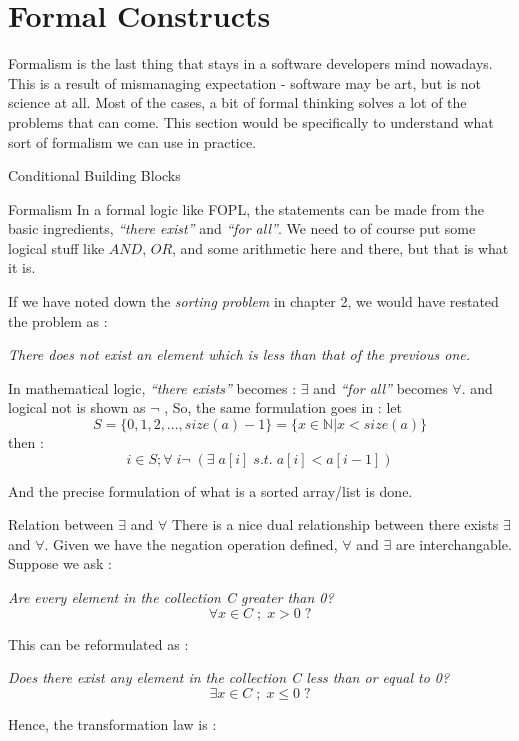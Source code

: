 \chapter{Formal Constructs}\label{using-predicates}

{\LARGE F}ormalism is the last thing that stays in a software developers mind nowadays. This is a result of mismanaging expectation - software may be art, but is not science at all. Most of the cases, a bit of formal thinking solves a lot of the problems that can come.
This section would be specifically to understand what sort of formalism we can use in practice.

\begin{section}{Conditional Building Blocks}

\begin{subsection}{Formalism}
In a formal logic like FOPL, the statements can be made from the basic ingredients, 
\emph{``there exist''} and \emph{``for all''}. We need to of course put some logical stuff like $AND$, $OR$,
and some arithmetic here and there, but that is what it is.

If we have noted down the \emph{sorting problem} in chapter 2, we would have restated the problem as :

\begin{center}
\emph{ There does not exist an element which is less than that of the previous one. }
\end{center} 

In mathematical logic, \emph{``there exists''} becomes : $\exists$ and \emph{``for all''} becomes $\forall$.
and logical not is shown as $\neg$ ,  So, the same formulation goes in : let 
$$
S = \{ 0, 1, 2, ... , size(a)-1  \} =  \{  x \in \mathbb{N} | x < size(a) \} 
$$
then :
$$
  i \in S ; \forall \; i  \neg \; ( \exists \; a[i] \; s.t. \; a[i] < a[i-1]    ) 
$$ 

And the precise formulation of what is a sorted array/list is done.
\end{subsection}
\begin{subsection}{Relation between $\exists$ and $\forall$ }
There is a nice dual relationship between there exists $\exists$ and $\forall$.
Given we have the negation operation defined, $\forall$ and $\exists$  are interchangable.
Suppose we ask :  
\begin{center}
\emph{ Are every element in the collection C greater than 0? }
$$
\forall x \in C \; ; \; x > 0 \; ?
$$
\end{center}
This can be reformulated as :
\begin{center}
\emph{ Does there exist any element in the collection C less than or equal to 0? }
$$
\exists x \in C \; ; \; x \le 0 \; ?
$$
\end{center}
Hence, the transformation law is :


\end{subsection}
\end{section}
